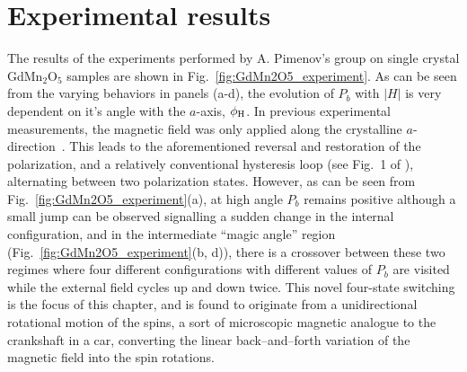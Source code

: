 \section{Experimental results}
\begin{figure*}[t]
    \centering
\caption{ \label{fig:GdMn2O5_experiment} {\bf Experimental measurements of the electric polarization.} (a) At higher temperatures only a small step is seen at the transition that shows some hysteresis and the two-state switching; (b) 4-state switching starts to appear approximately from $T=5$~K.(c) four-state hysteresis loop is clearly seen at $T=2.3$~K with the magnetic field at the ``magic'' angle;  
(d-f) Field dependence of the electric polarization of GdMn$_2$O$_5$ for different off-axis orientations of the applied magnetic field. (d,f): Conventional two-state switching is observed if magnetic field is (d) far away from the ``magic" direction  or (f) very close to the crystallographic $a$-axis. (e,g): Unusual four-state hysteresis loop for the magnetic field direction close to the magic angle of $\pm 9^o$. The inset shows the sequence of the magnetic field-sweeps. The labels 1-4 mark the four polarization states. The arrows show the direction of magnetic field-change during the sweep. The experiments have been done at $T=2.3$\,K. }
\end{figure*}
The results of the experiments performed by A. Pimenov's group on single crystal GdMn$_2$O$_5$ samples are shown in Fig.~\ref{fig:GdMn2O5_experiment}. As can be seen from the varying behaviors in panels (a-d), the evolution of $P_b$ with $|H|$ is very dependent on it's angle with the $a$-axis, $\phi_{\rm H}$.
In previous experimental measurements, the magnetic field was only applied along the crystalline $a$-direction~\cite{Lee13}.
This leads to the aforementioned reversal and restoration of the polarization, and a relatively conventional hysteresis loop (see Fig.~1 of \cite{Lee13}), alternating between two polarization states.
However, as can be seen from Fig.~\ref{fig:GdMn2O5_experiment}(a), at high angle $P_b$ remains positive although a small jump can be observed signalling a sudden change in the internal configuration, and in the intermediate ``magic angle'' region (Fig.~\ref{fig:GdMn2O5_experiment}(b, d)), there is a crossover between these two regimes  where four different configurations with different values of $P_b$ are visited while the external field cycles up and down twice.
This novel four-state switching is the focus of this chapter, and is found to originate from a unidirectional rotational motion of the spins, a sort of microscopic magnetic analogue to the crankshaft in a car, converting the linear back--and--forth variation of the magnetic field into the spin rotations.
